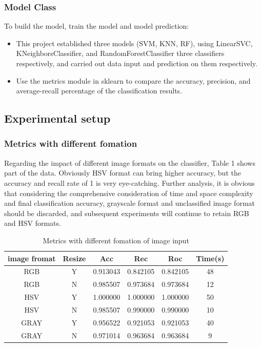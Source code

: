 \documentclass[conference]{IEEEtran}
\begin{document}
\subsubsection{Model Class}
To build the model, train the model and model prediction:
\begin{itemize}
\item This project established three models (SVM, KNN, RF), using LinearSVC, KNeighborsClassifier, and RandomForestClassifier three classifiers respectively, and carried out data input and prediction on them respectively.
\item Use the metrics module in sklearn to compare the accuracy, precision, and average-recall percentage of the classification results.
\end{itemize}

\subsection{Experimental setup}
\subsubsection{Metrics with different fomation}
Regarding the impact of different image formats on the classifier, Table 1 shows part of the data. Obviously HSV format can bring higher accuracy, but the accuracy and recall rate of 1 is very eye-catching. Further analysis, it is obvious that considering the comprehensive consideration of time and space complexity and final classification accuracy, grayscale format and unclassified image format should be discarded, and subsequent experiments will continue to retain RGB and HSV formats.
\begin{table}[htbp]
\caption{Metrics with different fomation of image input}
\begin{center}
\begin{tabular}{|c|c|c|c|c|c|}

\hline
image fromat& Resize &Acc&Rec &Roc&Time(s)\\
\hline
RGB& Y&0.913043&0.842105  &0.842105&48\\
\hline
RGB& N&0.985507 &0.973684  &0.973684&12\\
\hline
HSV& Y&1.000000&1.000000 &1.000000&50\\
\hline
HSV& N&0.985507&0.990000 &0.990000&10\\
\hline
GRAY& Y&0.956522 &0.921053  &0.921053&40\\
\hline
GRAY& N&0.971014 &0.963684  &0.963684&9\\
\hline

\end{tabular}
\label{tab1}
\end{center}
\end{table}
\end{document}
